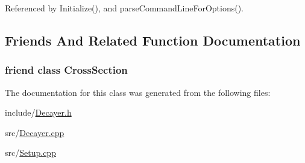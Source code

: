 Referenced by Initialize(), and parse\-Command\-Line\-For\-Options().



\subsection{Friends And Related Function Documentation}
\hypertarget{classDecayer_a4fae3d4b03faff9827a46178c567885b}{
\subsubsection[{Cross\-Section}]{\setlength{\rightskip}{0pt plus 5cm}friend class {\bf Cross\-Section}\hspace{0.3cm}{\ttfamily [friend]}}}\label{classDecayer_a4fae3d4b03faff9827a46178c567885b}


The documentation for this class was generated from the following files\-:\begin{DoxyCompactItemize}
\item 
include/\hyperlink{Decayer_8h}{Decayer.\-h}\item 
src/\hyperlink{Decayer_8cpp}{Decayer.\-cpp}\item 
src/\hyperlink{Setup_8cpp}{Setup.\-cpp}\end{DoxyCompactItemize}
